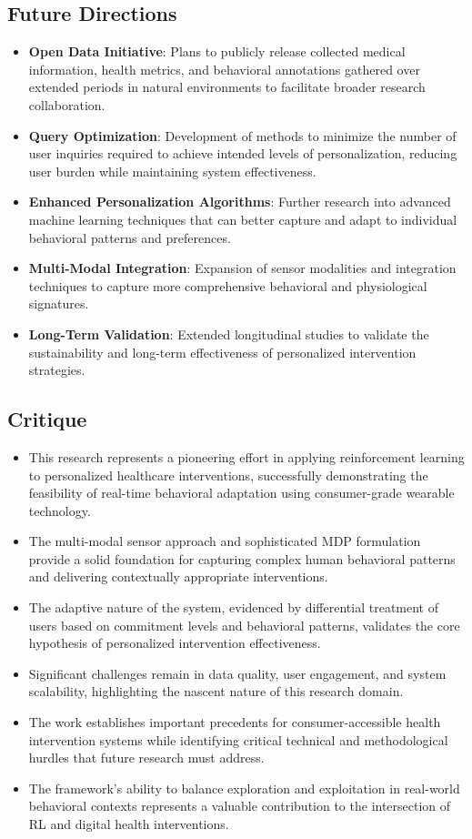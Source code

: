 \subsection*{Future Directions}
\begin{itemize}
    \item \textbf{Open Data Initiative}: Plans to publicly release collected medical information, health metrics, and behavioral annotations gathered over extended periods in natural environments to facilitate broader research collaboration.
    \item \textbf{Query Optimization}: Development of methods to minimize the number of user inquiries required to achieve intended levels of personalization, reducing user burden while maintaining system effectiveness.
    \item \textbf{Enhanced Personalization Algorithms}: Further research into advanced machine learning techniques that can better capture and adapt to individual behavioral patterns and preferences.
    \item \textbf{Multi-Modal Integration}: Expansion of sensor modalities and integration techniques to capture more comprehensive behavioral and physiological signatures.
    \item \textbf{Long-Term Validation}: Extended longitudinal studies to validate the sustainability and long-term effectiveness of personalized intervention strategies.
\end{itemize}

\subsection*{Critique}
\begin{itemize}
    \item This research represents a pioneering effort in applying reinforcement learning to personalized healthcare interventions, successfully demonstrating the feasibility of real-time behavioral adaptation using consumer-grade wearable technology.
    \item The multi-modal sensor approach and sophisticated MDP formulation provide a solid foundation for capturing complex human behavioral patterns and delivering contextually appropriate interventions.
    \item The adaptive nature of the system, evidenced by differential treatment of users based on commitment levels and behavioral patterns, validates the core hypothesis of personalized intervention effectiveness.
    \item Significant challenges remain in data quality, user engagement, and system scalability, highlighting the nascent nature of this research domain.
    \item The work establishes important precedents for consumer-accessible health intervention systems while identifying critical technical and methodological hurdles that future research must address.
    \item The framework's ability to balance exploration and exploitation in real-world behavioral contexts represents a valuable contribution to the intersection of RL and digital health interventions.
\end{itemize}

